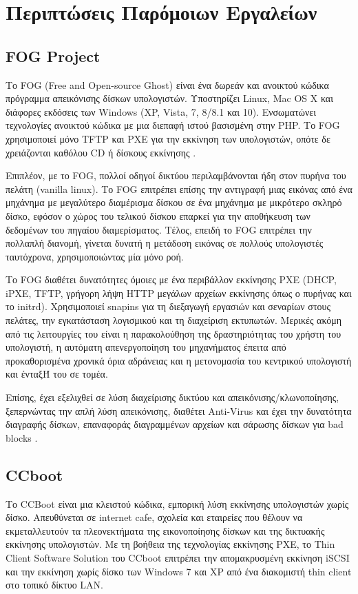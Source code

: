 \section{Περιπτώσεις Παρόμοιων Εργαλείων}
\subsection{FOG Project}
Το FOG (Free and Open-source Ghost) είναι ένα δωρεάν και ανοικτού κώδικα πρόγραμμα απεικόνισης δίσκων υπολογιστών. Υποστηρίζει Linux, Mac OS X και διάφορες εκδόσεις των Windows (XP, Vista, 7, 8/8.1 και 10). Ενσωματώνει τεχνολογίες ανοικτού κώδικα με μια διεπαφή ιστού βασισμένη στην PHP. Το FOG χρησιμοποιεί μόνο TFTP και PXE για την εκκίνηση των υπολογιστών, οπότε δε χρειάζονται καθόλου CD ή δίσκους εκκίνησης \cite{FOG_Project_2020}. 

Επιπλέον, με το FOG, πολλοί οδηγοί δικτύου περιλαμβάνονται ήδη στον πυρήνα του πελάτη (vanilla linux). Το FOG επιτρέπει επίσης την αντιγραφή μιας εικόνας από ένα μηχάνημα με μεγαλύτερο διαμέρισμα δίσκου σε ένα μηχάνημα με μικρότερο σκληρό δίσκο, εφόσον ο χώρος του τελικού δίσκου επαρκεί για την αποθήκευση των δεδομένων του πηγαίου διαμερίσματος. Τέλος, επειδή το FOG επιτρέπει την πολλαπλή διανομή, γίνεται δυνατή η μετάδοση εικόνας σε πολλούς υπολογιστές ταυτόχρονα, χρησιμοποιώντας μία μόνο ροή. 

Το FOG  διαθέτει δυνατότητες όμοιες με ένα περιβάλλον εκκίνησης PXE (DHCP, iPXE, TFTP, γρήγορη λήψη HTTP μεγάλων αρχείων εκκίνησης όπως ο πυρήνας και το initrd). Χρησιμοποιεί snapins για τη διεξαγωγή εργασιών και σεναρίων στους πελάτες, την εγκατάσταση λογισμικού και τη διαχείριση εκτυπωτών. Μερικές ακόμη από τις λειτουργίες του είναι η παρακολούθηση της δραστηριότητας του χρήστη του υπολογιστή, η αυτόματη απενεργοποίηση του μηχανήματος έπειτα από προκαθορισμένα χρονικά όρια αδράνειας και η μετονομασία του κεντρικού υπολογιστή και ένταξΉ του σε τομέα.

Επίσης, έχει εξελιχθεί σε λύση διαχείρισης δικτύου και απεικόνισης/κλωνοποίησης, ξεπερνώντας την απλή λύση απεικόνισης, διαθέτει Anti-Virus και έχει την δυνατότητα διαγραφής δίσκων, επαναφοράς διαγραμμένων αρχείων και σάρωσης δίσκων για bad blocks \cite{FOG_2020}.

\subsection{CCboot}
Το CCBoot είναι μια κλειστού κώδικα, εμπορική λύση εκκίνησης υπολογιστών χωρίς δίσκο. Aπευθύνεται σε internet cafe, σχολεία και εταιρείες που θέλουν να εκμεταλλευτούν τα πλεονεκτήματα της εικονοποίησης δίσκων και της δικτυακής εκκίνησης υπολογιστών. Με τη βοήθεια της τεχνολογίας εκκίνησης PXE, το Thin Client Software Solution του CCboot επιτρέπει την απομακρυσμένη εκκίνηση iSCSI και την εκκίνηση χωρίς δίσκο των Windows 7 και XP από ένα διακομιστή thin client στο τοπικό δίκτυο LAN.

